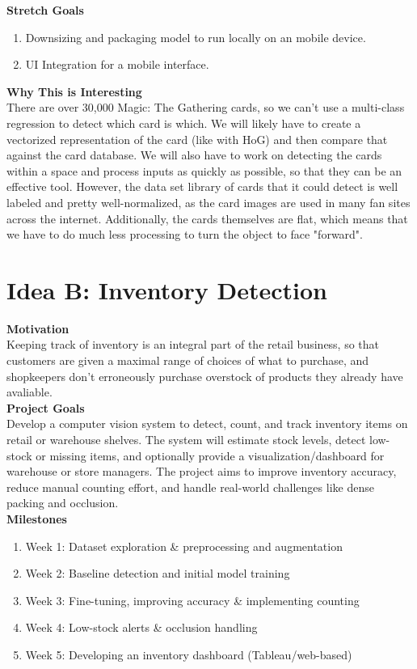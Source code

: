 \documentclass{article}
\begin{document}
\textbf{Stretch Goals}
\begin{enumerate}
    \item Downsizing and packaging model to run locally on an mobile device.
    \item UI Integration for a mobile interface.
\end{enumerate}

\textbf{Why This is Interesting} \\
There are over 30,000 Magic: The Gathering cards, so we can't use a multi-class regression to detect which card is which. We will likely have to create a vectorized representation of the card (like with HoG) and then compare that against the card database. We will also have to work on detecting the cards within a space and process inputs as quickly as possible, so that they can be an effective tool. However, the data set library of cards that it could detect is well labeled and pretty well-normalized, as the card images are used in many fan sites across the internet. Additionally, the cards themselves are flat, which means that we have to do much less processing to turn the object to face "forward".

\section*{Idea B: Inventory Detection}

\textbf{Motivation} \\
Keeping track of inventory is an integral part of the retail business, so that customers are given a maximal range of choices of what to purchase, and shopkeepers don't erroneously purchase overstock of products they already have avaliable.  \\

\textbf{Project Goals} \\
Develop a computer vision system to detect, count, and track inventory items on retail or warehouse shelves. The system will estimate stock levels, detect low-stock or missing items, and optionally provide a visualization/dashboard for warehouse or store managers. The project aims to improve inventory accuracy, reduce manual counting effort, and handle real-world challenges like dense packing and occlusion. \\

\textbf{Milestones} \\
\begin{enumerate}
    \item Week 1: Dataset exploration \& preprocessing and augmentation
    \item Week 2: Baseline detection and initial model training
    \item Week 3: Fine-tuning, improving accuracy \& implementing counting
    \item Week 4: Low-stock alerts \& occlusion handling
    \item Week 5: Developing an inventory dashboard (Tableau/web-based)
\end{enumerate}
\end{document}
